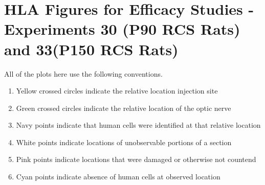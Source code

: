 \documentclass{article}
\begin{document}
\section{HLA Figures for Efficacy Studies - Experiments 30 (P90 RCS Rats) and 33(P150 RCS Rats)}
All of the plots here use the following conventions. 
\begin{enumerate}
\item Yellow crossed circles indicate the relative location injection site
\item Green crossed circles indicate the relative location of the optic nerve
\item Navy points indicate that human cells were identified at that relative location
\item White points indicate locations of unobservable portions of a section
\item Pink points indicate locations that were damaged or otherwise not countend
\item Cyan points indicate absence of human cells at observed location
\end{enumerate}
\end{document}
